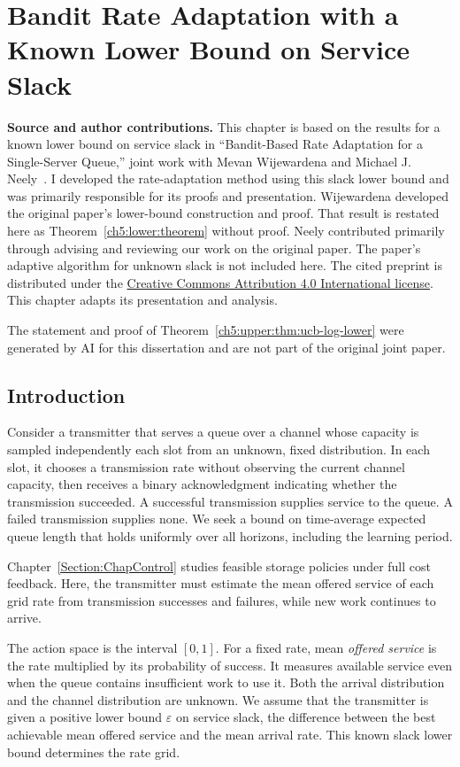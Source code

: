 \chapter{Bandit Rate Adaptation with a Known Lower Bound on Service Slack}
\label{Section:ChapRateAdaptation}
\noindent\textbf{Source and author contributions.}
This chapter is based on the results for a known lower bound on service slack in
``Bandit-Based Rate Adaptation for a Single-Server Queue,'' joint work with
Mevan Wijewardena and Michael J. Neely~\cite{wijewardena2026banditbased}.
I developed the rate-adaptation method using this slack lower bound and was primarily
responsible for its proofs and presentation. Wijewardena developed the
original paper's lower-bound construction and proof. That result is
restated here as Theorem~\ref{ch5:lower:theorem} without proof. Neely contributed
primarily through advising and reviewing our work on the original paper.
The paper's adaptive algorithm for unknown slack is not included here.
The cited preprint is distributed under the
\href{https://creativecommons.org/licenses/by/4.0/}{Creative Commons Attribution
4.0 International license}. This chapter adapts its presentation and analysis.

The statement and proof of Theorem~\ref{ch5:upper:thm:ucb-log-lower} were
generated by AI for this dissertation and are not part of the original
joint paper.

\section{Introduction}
\label{ch5:sec:introduction}

Consider a transmitter that serves a queue over a channel whose capacity
is sampled independently each slot from an unknown, fixed distribution.
In each slot, it chooses a transmission rate without observing the current
channel capacity, then receives a binary acknowledgment indicating whether
the transmission succeeded.
A successful transmission supplies service to the queue. A failed
transmission supplies none. We seek a bound on time-average expected queue
length that holds uniformly over all horizons, including the learning period.

Chapter~\ref{Section:ChapControl}
studies feasible storage policies under full cost feedback. Here, the
transmitter must estimate the mean offered service of each grid rate from
transmission successes and failures, while new work continues to arrive.

The action space is the interval $[0,1]$. For a fixed rate, mean
\emph{offered service} is the rate multiplied by its probability of success.
It measures available service even when the queue contains insufficient work
to use it. Both the arrival distribution and the channel
distribution are unknown. We assume that the transmitter is given a positive
lower bound $\varepsilon$ on service slack, the difference between the best
achievable mean offered service and the mean arrival rate. This known slack
lower bound determines the rate grid.


